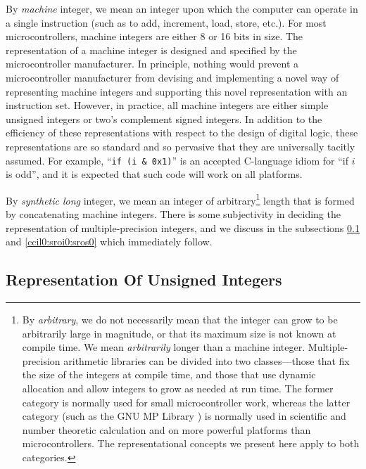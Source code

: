 By \emph{machine} integer, we mean an integer upon which the computer
can operate in a single instruction (such as to add, increment,
load, store, etc.).  For most microcontrollers, machine integers are
either 8 or 16 bits in size.  The representation of a machine integer
is designed and specified by the microcontroller manufacturer.  In principle,
nothing would prevent a microcontroller manufacturer from devising
and implementing a novel way of representing machine integers and supporting
this novel representation with an instruction set.  However, in 
practice, all machine integers are either simple unsigned integers or two's
complement signed integers.  In addition to the efficiency of these
representations with respect to the design of digital logic, these representations
are so standard and so pervasive that they are universally tacitly assumed.
For example, ``\texttt{if (i \& 0x1)}'' is an accepted C-language
idiom for ``if $i$ is odd'', and it is expected that such code will
work on all platforms.

By \emph{synthetic long} integer, we mean an integer of 
arbitrary\footnote{By \emph{arbitrary}, we do not necessarily mean that
the integer can grow to be arbitrarily large in magnitude, or that
its maximum size is not known at compile time.  We mean \emph{arbitrarily}
longer than a machine integer.  Multiple-precision arithmetic libraries
can be divided into two classes---those that fix the size of the integers
at compile time, and those that use dynamic allocation and allow integers to
grow as needed at run time.  The former category
is normally used for small microcontroller work, whereas the latter category
(such as the GNU MP Library \cite{bibref:s:gnumultipleprecisionarithmeticlibrary})
is normally used in scientific and number theoretic calculation and on 
more powerful platforms than microcontrollers.  The representational concepts
we present here apply to both categories.}
length that is formed by concatenating machine integers.  There is some
subjectivity in deciding the representation of multiple-precision integers,
and we discuss in the subsections
\ref{ccil0:sroi0:srou0} and
\ref{ccil0:sroi0:sros0} which immediately follow.


\subsection{Representation Of Unsigned Integers}
\label{ccil0:sroi0:srou0}

